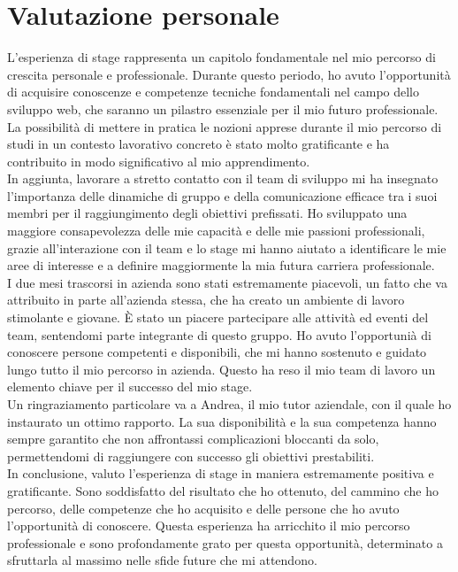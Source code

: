 \section{Valutazione personale}

L'esperienza di stage rappresenta un capitolo fondamentale nel mio percorso di crescita personale e professionale. Durante questo periodo, ho avuto l'opportunità di acquisire conoscenze e competenze tecniche 
fondamentali nel campo dello sviluppo web, che saranno un pilastro essenziale per il mio futuro professionale. La possibilità di mettere in pratica le nozioni apprese durante il mio percorso di studi in un contesto
lavorativo concreto è stato molto gratificante e ha contribuito in modo significativo al mio apprendimento.\\
In aggiunta, lavorare a stretto contatto con il team di sviluppo mi ha insegnato l'importanza delle dinamiche di gruppo e della comunicazione efficace tra i suoi membri per il raggiungimento degli obiettivi prefissati.
Ho sviluppato una maggiore consapevolezza delle mie capacità e delle mie passioni professionali, grazie all'interazione con il team e lo stage mi hanno aiutato a identificare le mie aree di interesse e a definire 
maggiormente la mia futura carriera professionale.\\
I due mesi trascorsi in azienda sono stati estremamente piacevoli, un fatto che va attribuito in parte all'azienda stessa, che ha creato un ambiente di lavoro stimolante e giovane.
È stato un piacere partecipare alle attività ed eventi del team, sentendomi parte integrante di questo gruppo. Ho avuto l'opportunià di conoscere persone competenti e disponibili, che mi hanno sostenuto e guidato 
lungo tutto il mio percorso in azienda. Questo ha reso il mio team di lavoro un elemento chiave per il successo del mio stage.\\
Un ringraziamento particolare va a Andrea, il mio tutor aziendale, con il quale ho instaurato un ottimo rapporto. La sua disponibilità e la sua competenza hanno sempre garantito che non affrontassi complicazioni bloccanti da solo, 
permettendomi di raggiungere con successo gli obiettivi prestabiliti.\\

In conclusione, valuto l'esperienza di stage in maniera estremamente positiva e gratificante. Sono soddisfatto del risultato che ho ottenuto, del cammino che ho percorso, delle competenze 
che ho acquisito e delle persone che ho avuto l'opportunità di conoscere. Questa esperienza ha arricchito il mio percorso professionale e sono profondamente grato per questa opportunità, 
determinato a sfruttarla al massimo nelle sfide future che mi attendono.